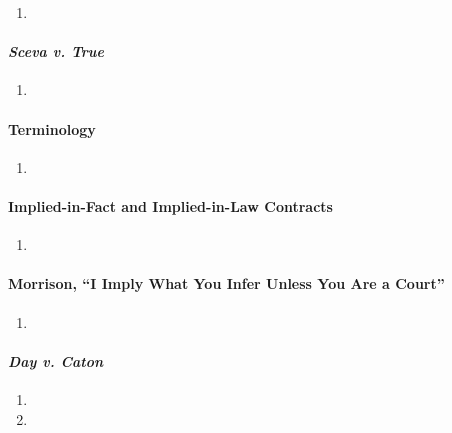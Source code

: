 \begin{enumerate}
    \item %
\end{enumerate}

\paragraph{\emph{Sceva v. True}}

\begin{enumerate}
    \item %
\end{enumerate}

\paragraph{Terminology}

\begin{enumerate}
    \item %
\end{enumerate}

\paragraph{Implied-in-Fact and Implied-in-Law Contracts}

\begin{enumerate}
    \item %
\end{enumerate}

\paragraph{Morrison, ``I Imply What You Infer Unless You Are a Court''}

\begin{enumerate}
    \item %
\end{enumerate}

\paragraph{\emph{Day v. Caton}}

\begin{enumerate}
    \item %
    \item %
\end{enumerate}

